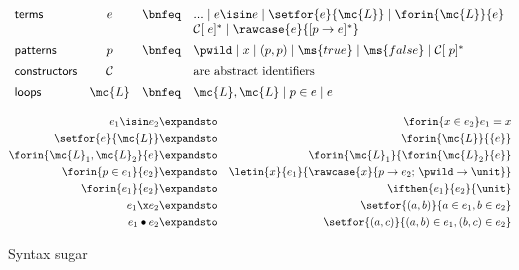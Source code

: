 \documentclass[preprint]{sigplanconf}
\renewcommand{\pipe}{\mathrel{\mid}} %
\begin{document}

\begin{figure}
  \[\begin{array}{lccl}
  \textsf{terms} &
  e &\bnfeq& ... \pipe e \isin e \pipe \setfor{e}{\mc{L}}
             \pipe \forin{\mc{L}}{e}\\
  &&& \mathcal{C}[\;e]^* \pipe \rawcase{e}{[{p} \to {e}]^*}
  \vspace{0.5em}\\
  \textsf{patterns} &
  p &\bnfeq& \pwild \pipe x \pipe (p,p)
             \pipe \ms{true} \pipe \ms{false} \pipe \mathcal{C}[\;p]^*
  \vspace{0.5em}\\
  \textsf{constructors} & \mathcal{C} && \text{are abstract identifiers}
  \vspace{0.5em}\\
  \textsf{loops} &
  \mc{L} &\bnfeq& \mc{L}, \mc{L} \pipe p \in e \pipe e
  \end{array}\]

  \begin{eqnarray*}
    e_1 \isin e_2            &\expandsto& \forin{x \in e_2} e_1 = x\\
    \setfor{e}{\mc{L}}       &\expandsto& \forin{\mc{L}}{\{e\}}\\
    \forin{\mc{L}_1,\mc{L}_2}{e}
    &\expandsto& \forin{\mc{L}_1}{\forin{\mc{L}_2}{e}}\\
    \forin{p\in e_1}{e_2}
    &\expandsto& \letin{x}{e_1}{\rawcase{x}{p \to e_2;\,\pwild \to \unit}}\\
    \forin{e_1}{e_2} &\expandsto& \ifthen{e_1}{e_2}{\unit}\\
    e_1 \x e_2 &\expandsto& \setfor{(a,b)}{a \in e_1, b \in e_2}\\
    e_1 \bullet e_2 &\expandsto& \setfor{(a,c)}{(a,b) \in e_1, (b,c) \in e_2}
  \end{eqnarray*}
  \caption{Syntax sugar}
  \label{fig:sugar}
\end{figure}
\end{document}
